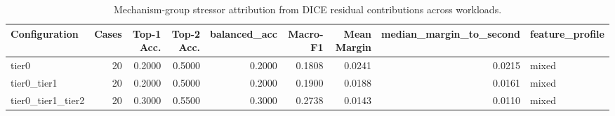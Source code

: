 \begin{table}[t]
\centering
\caption{Mechanism-group stressor attribution from DICE residual contributions across workloads.}
\label{tab:dice_stressor_diagnosis}
\footnotesize
\begin{tabular}{lrrrrrrrl}
\toprule
Configuration & Cases & Top-1 Acc. & Top-2 Acc. & balanced_acc & Macro-F1 & Mean Margin & median_margin_to_second & feature_profile \\
\midrule
tier0 & 20 & 0.2000 & 0.5000 & 0.2000 & 0.1808 & 0.0241 & 0.0215 & mixed \\
tier0_tier1 & 20 & 0.2000 & 0.5000 & 0.2000 & 0.1900 & 0.0188 & 0.0161 & mixed \\
tier0_tier1_tier2 & 20 & 0.3000 & 0.5500 & 0.3000 & 0.2738 & 0.0143 & 0.0110 & mixed \\
\bottomrule
\end{tabular}

\end{table}
